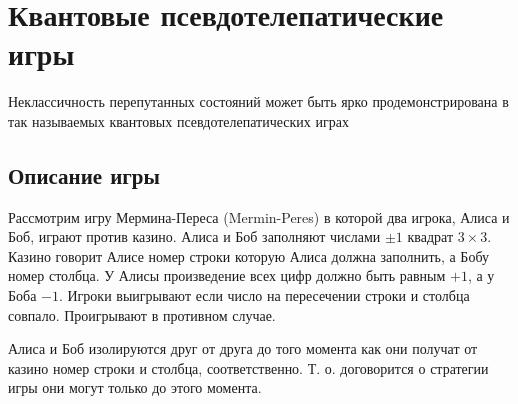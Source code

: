 \section{Квантовые псевдотелепатические игры}

Неклассичность перепутанных состояний может быть ярко
продемонстрирована в так называемых квантовых псевдотелепатических играх
\cite{bPseudoTelepathy2003,bPseudoTelepathy2004}

\subsection{Описание игры}
Рассмотрим игру Мермина-Переса (Mermin-Peres) в которой два игрока,
Алиса и Боб, играют против казино. 
Алиса и Боб заполняют числами $\pm 1$ квадрат $3 \times 3$.
Казино говорит Алисе номер строки которую Алиса должна заполнить, а
Бобу номер столбца. У Алисы произведение всех цифр должно быть равным
$+1$, а у Боба $-1$. Игроки выигрывают если число на пересечении
строки и столбца совпало. Проигрывают в противном случае.

Алиса и Боб изолируются друг от друга до того момента как они получат
от казино номер строки и столбца, соответственно. Т. о. договорится о
стратегии игры они могут только до этого момента.

